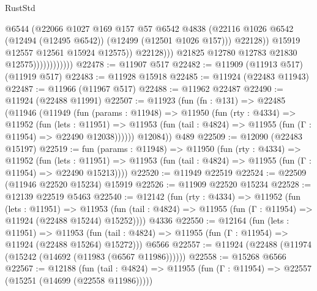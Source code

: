 \begin{lexlean}{RustStd}
\begin{coremodule}
{\begin{coremodule}
{{{{{{{{{{{{{{{{{{{{{{{{{{{{{{{{{{{{{{{{{{{{{{{{{{{{{{{{{{{{{{{{{{{{{{{{{{{{{{{{                                        @6544
                                        (@22066
                                          @1027
                                          @169
                                          @157
                                          @57
                                          @6542
                                          @4838
                                          (@22116
                                            @1026
                                            @6542
                                            (@12494 (@12495 @6542))
                                            (@12499 (@12501 @1026 @157)))
                                          @22128))
                                      @15919
                                      @12557
                                      @12561
                                      @15924
                                      @12575))
                                  @22128)))
                            @21825
                            @12780
                            @12783
                            @21830
                            @12575))))))))))))
@22478 := @11907 @517
@22482 := @11909 (@11913 @517) (@11919 @517)
@22483 := @11928 @15918
@22485 := @11924 (@22483 @11943)
@22487 := @11966 (@11967 @517)
@22488 := @11962 @22487
@22490 := @11924 (@22488 @11991)
@22507 := @11923
    (fun (fn : @131) =>
    @22485
      (@11946
        (@11949
          (fun (params : @11948) =>
          @11950
            (fun (rty : @4334) =>
            @11952
              (fun (lets : @11951) =>
              @11953 (fun (tail : @4824) => @11955 (fun (Γ : @11954) => @22490 @12038))))))
        @12084))
    @489
@22509 := @12090 (@22483 @15197)
@22519 := fun (params : @11948) =>
  @11950
    (fun (rty : @4334) =>
    @11952
      (fun (lets : @11951) =>
      @11953 (fun (tail : @4824) => @11955 (fun (Γ : @11954) => @22490 @15213))))
@22520 := @11949 @22519
@22524 := @22509 (@11946 @22520 @15234) @15919
@22526 := @11909 @22520 @15234
@22528 := @12139 @22519 @5463
@22540 := @12142
    (fun (rty : @4334) =>
    @11952
      (fun (lets : @11951) =>
      @11953 (fun (tail : @4824) => @11955 (fun (Γ : @11954) => @11924 (@22488 @15244) @15252))))
    @4336
@22550 := @12164
    (fun (lets : @11951) =>
    @11953 (fun (tail : @4824) => @11955 (fun (Γ : @11954) => @11924 (@22488 @15264) @15272)))
    @6566
@22557 := @11924 (@22488 (@11974 (@15242 (@14692 (@11983 (@6567 @11986))))))
@22558 := @15268 @6566
@22567 := @12188
    (fun (tail : @4824) => @11955 (fun (Γ : @11954) => @22557 (@15251 (@14699 (@22558 @11986)))))
}}}}}}}}}}}}}}}}}}}}}}}}}}}}}}}}}}}}}}}}}}}}}}}}}}}}}}}}}}}}}}}}}}}}}}}}}}}}}}}}
\end{coremodule}}
\end{coremodule}
\end{lexlean}
